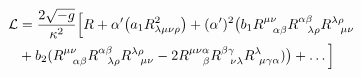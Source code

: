 \begin{equation}\begin{split}\label{eq9}
{\cal L} &= \frac{2\sqrt{-g}}{\kappa^2}\Big[R + \alpha'\big(a_1 R_{\lambda\mu\nu\rho}^2\big)
+(\alpha')^2\big(b_1 R^{\mu\nu}_{\ \  \alpha\beta}
R^{\alpha\beta}_{\ \  \lambda\rho}
R^{\lambda\rho}_{\ \  \mu\nu}\\& +b_2 (R^{\mu\nu}_{\ \  \alpha\beta}
R^{\alpha\beta}_{\ \  \lambda\rho}
R^{\lambda\rho}_{\ \  \mu\nu}-2R^{\mu\nu\alpha}_{\ \ \ \beta}
R_{\ \ \nu\lambda}^{\beta\gamma}
R^{\lambda}_{\ \mu\gamma\alpha})\big)+\ldots\Big]
\end{split}\end{equation}

